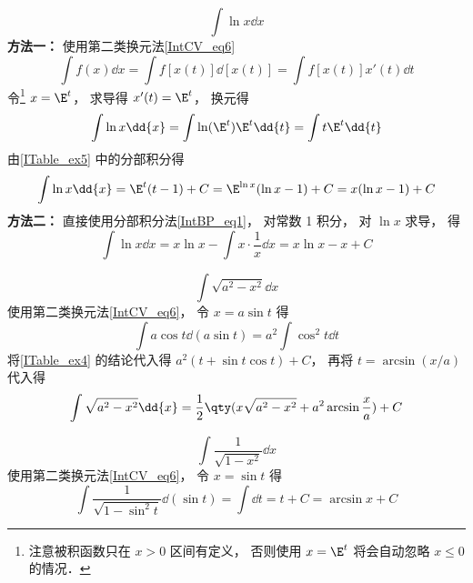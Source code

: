 \begin{example}{}\label{ITable_ex6}
\begin{equation}
\int \ln x \dd{x}
\end{equation}
\textbf{方法一：} 使用第二类换元法\autoref{IntCV_eq6}
\begin{equation}
\int f(x) \dd{x} = \int f[x(t)] \dd{[x(t)]} = \int f[x(t)]x'(t) \dd{t}
\end{equation}
令\footnote{注意被积函数只在 $x>0$ 区间有定义， 否则使用 $x = \E^t$ 将会自动忽略 $x\leqslant 0$ 的情况．} $x = \E^t$， 求导得 $x'(t) = \E^t$， 换元得
\begin{equation}
\int \ln x \dd{x} = \int \ln(\E^t) \E^t  \dd{t} = \int t \E^t  \dd{t}
\end{equation}
由\autoref{ITable_ex5} 中的分部积分得
\begin{equation}
\int \ln x \dd{x} = \E^t (t-1) + C = \E^{\ln x} (\ln x -1) + C = x (\ln x-1) + C
\end{equation}
\textbf{方法二：} 直接使用分部积分法\autoref{IntBP_eq1}， 对常数 1 积分， 对 $\ln x$ 求导， 得
\begin{equation}
\int \ln x \dd{x} = x\ln x - \int x\cdot \frac1x \dd{x} = x\ln x - x + C
\end{equation}
\end{example}

\begin{example}{}\label{ITable_ex12}
\begin{equation}
\int \sqrt{a^2 - x^2} \dd{x}
\end{equation}
使用第二类换元法\autoref{IntCV_eq6}， 令 $x = a\sin t$ 得
\begin{equation}
\int a\cos t \dd(a\sin t) = a^2 \int \cos^2 t \dd{t}
\end{equation}
将\autoref{ITable_ex4} 的结论代入得 $a^2(t + \sin t\cos t) + C$， 再将 $t = \arcsin(x/a)$ 代入得
\begin{equation}
\int \sqrt{a^2 - x^2}\dd{x} = \frac12 \qty(x\sqrt{a^2 - x^2} + a^2\arcsin\frac{x}{a}) + C
\end{equation}
\end{example}

\begin{example}{}\label{ITable_ex8}
\begin{equation}
\int \frac{1}{\sqrt{1-x^2}} \dd{x} 
\end{equation}
使用第二类换元法\autoref{IntCV_eq6}， 令 $x = \sin t$ 得
\begin{equation}
\int \frac{1}{\sqrt{1-\sin^2 t}} \dd(\sin t) = \int \dd{t} = t + C = \arcsin x + C
\end{equation}
\end{example}

